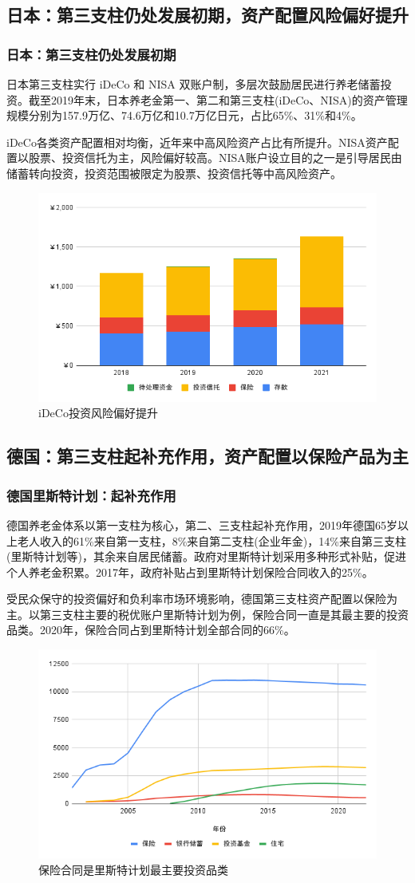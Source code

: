 \documentclass[a4paper,zihao=5]{ctexbeamer}
\begin{document}
\subsection{日本：第三支柱仍处发展初期，资产配置风险偏好提升}
\begin{frame}
    \frametitle{日本：第三支柱仍处发展初期}
    日本第三支柱实行 iDeCo 和 NISA 双账户制，多层次鼓励居民进行养老储蓄投资。截至2019年末，日本养老金第一、第二和第三支柱(iDeCo、NISA)的资产管理规模分别为157.9万亿、74.6万亿和10.7万亿日元，占比65\%、31\%和4\%。

    iDeCo各类资产配置相对均衡，近年来中高风险资产占比有所提升。NISA资产配置以股票、投资信托为主，风险偏好较高。NISA账户设立目的之一是引导居民由储蓄转向投资，投资范围被限定为股票、投资信托等中高风险资产。
    \begin{figure}[H]
        \centering
        \includegraphics[width=0.5\linewidth]{img/iDeCo投资风险偏好提升.png}
        \caption{iDeCo投资风险偏好提升}
    \end{figure}
\end{frame}




\subsection{德国：第三支柱起补充作用，资产配置以保险产品为主}
\begin{frame}
    \frametitle{德国里斯特计划：起补充作用}
    德国养老金体系以第一支柱为核心，第二、三支柱起补充作用，2019年德国65岁以上老人收入的61\%来自第一支柱，8\%来自第二支柱(企业年金)，14\%来自第三支柱(里斯特计划等)，其余来自居民储蓄。政府对里斯特计划采用多种形式补贴，促进个人养老金积累。2017年，政府补贴占到里斯特计划保险合同收入的25\%。

    受民众保守的投资偏好和负利率市场环境影响，德国第三支柱资产配置以保险为主。以第三支柱主要的税优账户里斯特计划为例，保险合同一直是其最主要的投资品类。2020年，保险合同占到里斯特计划全部合同的66\%。
    \begin{figure}[H]
        \centering
        \includegraphics[width=0.5\linewidth]{img/保险合同是里斯特计划最主要投资品类.png}
        \caption{保险合同是里斯特计划最主要投资品类}
    \end{figure}
\end{frame}
\end{document}
